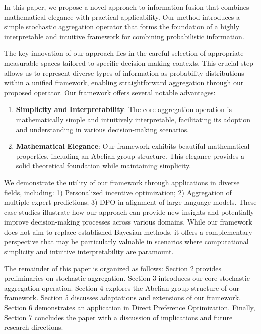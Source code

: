 \documentclass[letterpaper]{article} %
\theoremstyle{definition}
\theoremstyle{remark}
\begin{document}
In this paper, we propose a novel approach to information fusion that combines mathematical elegance with practical applicability. Our method introduces a simple stochastic aggregation operator that forms the foundation of a highly interpretable and intuitive framework for combining probabilistic information.

The key innovation of our approach lies in the careful selection of appropriate measurable spaces tailored to specific decision-making contexts. This crucial step allows us to represent diverse types of information as probability distributions within a unified framework, enabling straightforward aggregation through our proposed operator. Our framework offers several notable advantages:

\begin{enumerate}
    \item \textbf{Simplicity and Interpretability}: The core aggregation operation is mathematically simple and intuitively interpretable, facilitating its adoption and understanding in various decision-making scenarios.
    
    \item \textbf{Mathematical Elegance}: Our framework exhibits beautiful mathematical properties, including an Abelian group structure. This elegance provides a solid theoretical foundation while maintaining simplicity.
    
\end{enumerate}

We demonstrate the utility of our framework through applications in diverse fields, including: 1) Personalized incentive optimization; 2) Aggregation of multiple expert predictions; 3) DPO in alignment of large language models. These case studies illustrate how our approach can provide new insights and potentially improve decision-making processes across various domains. While our framework does not aim to replace established Bayesian methods, it offers a complementary perspective that may be particularly valuable in scenarios where computational simplicity and intuitive interpretability are paramount.

The remainder of this paper is organized as follows: Section 2 provides preliminaries on stochastic aggregation. Section 3 introduces our core stochastic aggregation operation. Section 4 explores the Abelian group structure of our framework. Section 5 discusses adaptations and extensions of our framework. Section 6 demonstrates an application in Direct Preference Optimization. Finally, Section 7 concludes the paper with a discussion of implications and future research directions.
\end{document}
